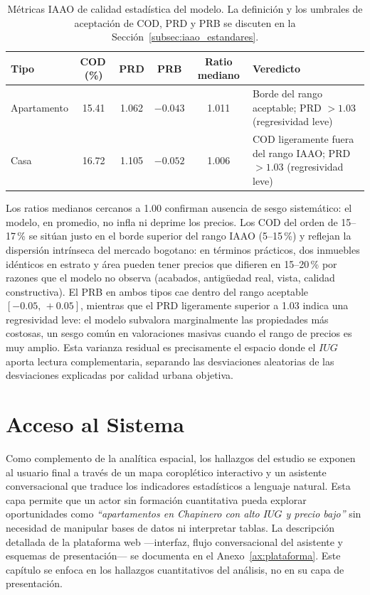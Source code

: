 \documentclass[12pt, a4paper, twoside, openright]{report}
\theoremstyle{plain}
\theoremstyle{definition}
\newcommand{\IUG}{IUG}             %
\begin{document}
\begin{table}[htbp]
\centering
\caption{Métricas IAAO de calidad estadística del modelo. La definición y los umbrales de aceptación de COD, PRD y PRB se discuten en la Sección~\ref{subsec:iaao_estandares}.}
\label{tab:iaao_res}
\small
\begin{tabular}{@{}lccccl@{}}
\toprule
\textbf{Tipo} & \textbf{COD\,(\%)} & \textbf{PRD} & \textbf{PRB} & \textbf{Ratio mediano} & \textbf{Veredicto} \\
\midrule
Apartamento & 15.41 & 1.062 & $-0.043$ & 1.011 & Borde del rango aceptable; PRD $>1.03$ (regresividad leve) \\
Casa        & 16.72 & 1.105 & $-0.052$ & 1.006 & COD ligeramente fuera del rango IAAO; PRD $>1.03$ (regresividad leve) \\
\bottomrule
\end{tabular}
\end{table}

Los ratios medianos cercanos a 1.00 confirman ausencia de sesgo sistemático: el modelo, en promedio, no infla ni deprime los precios. Los COD del orden de 15--17\,\% se sitúan justo en el borde superior del rango IAAO (5--15\,\%) y reflejan la dispersión intrínseca del mercado bogotano: en términos prácticos, dos inmuebles idénticos en estrato y área pueden tener precios que difieren en 15--20\,\% por razones que el modelo no observa (acabados, antigüedad real, vista, calidad constructiva). El PRB en ambos tipos cae dentro del rango aceptable $[-0.05,\,+0.05]$, mientras que el PRD ligeramente superior a 1.03 indica una regresividad leve: el modelo subvalora marginalmente las propiedades más costosas, un sesgo común en valoraciones masivas cuando el rango de precios es muy amplio. Esta varianza residual es precisamente el espacio donde el $\IUG{}$ aporta lectura complementaria, separando las desviaciones aleatorias de las desviaciones explicadas por calidad urbana objetiva.


\section{Acceso al Sistema}\label{sec:acceso}

Como complemento de la analítica espacial, los hallazgos del estudio se exponen al usuario final a través de un mapa coroplético interactivo y un asistente conversacional que traduce los indicadores estadísticos a lenguaje natural. Esta capa permite que un actor sin formación cuantitativa pueda explorar oportunidades como \emph{``apartamentos en Chapinero con alto $\IUG$ y precio bajo''} sin necesidad de manipular bases de datos ni interpretar tablas. La descripción detallada de la plataforma web ---interfaz, flujo conversacional del asistente y esquemas de presentación--- se documenta en el Anexo~\ref{ax:plataforma}. Este capítulo se enfoca en los hallazgos cuantitativos del análisis, no en su capa de presentación.
\end{document}
